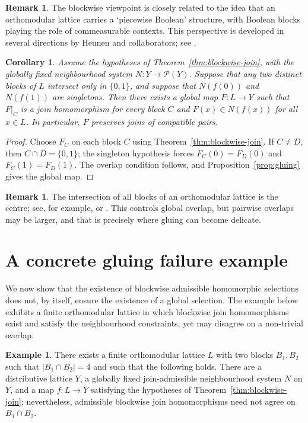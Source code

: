 \documentclass[11pt]{amsart}
\newtheorem{corollary}[theorem]{Corollary}
\theoremstyle{definition}
\newtheorem{remark}[theorem]{Remark}
\newtheorem{example}[theorem]{Example}
\newcommand{\Pow}{\mathcal{P}}
\begin{document}
\begin{remark}
The blockwise viewpoint is closely related to the idea that an orthomodular lattice carries a `piecewise Boolean' structure,
with Boolean blocks playing the role of commeasurable contexts.
This perspective is developed in several directions by Heunen and collaborators; see \cite{HeunenPBA,HardingHeunenLN}.
\end{remark}

\begin{corollary}\label{cor:glue-01}
Assume the hypotheses of Theorem~\ref{thm:blockwise-join}, with the globally fixed neighbourhood system $N\colon Y\to\Pow(Y)$.
Suppose that any two distinct blocks of $L$ intersect only in $\{0,1\}$, and suppose that $N(f(0))$ and $N(f(1))$ are singletons.
Then there exists a global map $F\colon L\to Y$ such that $F|_C$ is a join homomorphism for every block $C$
and $F(x)\in N(f(x))$ for all $x\in L$.
In particular, $F$ preserves joins of compatible pairs.
\end{corollary}

\begin{proof}
Choose $F_C$ on each block $C$ using Theorem~\ref{thm:blockwise-join}.
If $C\ne D$, then $C\cap D=\{0,1\}$; the singleton hypothesis forces $F_C(0)=F_D(0)$ and $F_C(1)=F_D(1)$.
The overlap condition follows, and Proposition~\ref{prop:gluing} gives the global map.
\end{proof}

\begin{remark}
The intersection of all blocks of an orthomodular lattice is the centre; see, for example, \cite[Chapter~7]{Kalmbach} or \cite[Section~1.5]{PtP}.
This controls global overlap, but pairwise overlaps may be larger, and that is precisely where gluing can become delicate.
\end{remark}

\section{A concrete gluing failure example}
We now show that the existence of blockwise admissible homomorphic selections does not, by itself,
ensure the existence of a global selection.
The example below exhibits a finite orthomodular lattice in which blockwise join homomorphisms
exist and satisfy the neighbourhood constraints, yet may disagree on a non-trivial overlap.

\begin{example}\label{ex:glue-failure}
There exists a finite orthomodular lattice $L$ with two blocks $B_1,B_2$ such that $|B_1\cap B_2|=4$ and such that the following holds.
There are a distributive lattice $Y$, a globally fixed join-admissible neighbourhood system $N$ on $Y$, and a map $f\colon L\to Y$ satisfying the hypotheses of Theorem~\ref{thm:blockwise-join}; nevertheless, admissible blockwise join homomorphisms need not agree on $B_1\cap B_2$.
\end{example}
\end{document}
